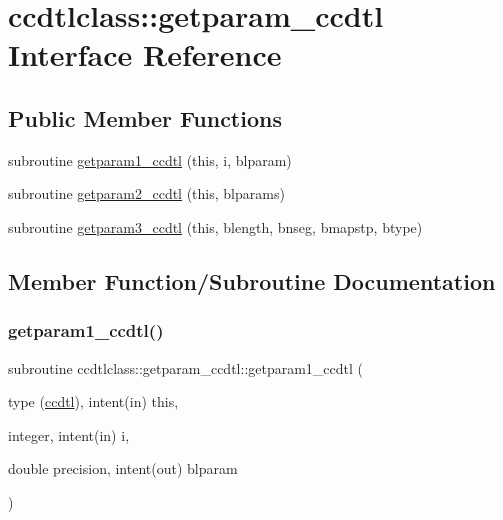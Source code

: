 \hypertarget{interfaceccdtlclass_1_1getparam__ccdtl}{}\section{ccdtlclass\+::getparam\+\_\+ccdtl Interface Reference}
\label{interfaceccdtlclass_1_1getparam__ccdtl}
\subsection*{Public Member Functions}
\begin{DoxyCompactItemize}
\item 
subroutine \mbox{\hyperlink{interfaceccdtlclass_1_1getparam__ccdtl_aaaf3cd47d60dd98385c6a0b9b54beacf}{getparam1\+\_\+ccdtl}} (this, i, blparam)
\item 
subroutine \mbox{\hyperlink{interfaceccdtlclass_1_1getparam__ccdtl_a3902162821423941373ef12a3ad5de5f}{getparam2\+\_\+ccdtl}} (this, blparams)
\item 
subroutine \mbox{\hyperlink{interfaceccdtlclass_1_1getparam__ccdtl_a9d1046f5acff002e8457add43770fa9c}{getparam3\+\_\+ccdtl}} (this, blength, bnseg, bmapstp, btype)
\end{DoxyCompactItemize}


\subsection{Member Function/\+Subroutine Documentation}
\mbox{\label{interfaceccdtlclass_1_1getparam__ccdtl_aaaf3cd47d60dd98385c6a0b9b54beacf}} 
\subsubsection{\texorpdfstring{getparam1\_ccdtl()}{getparam1\_ccdtl()}}
{\footnotesize\ttfamily subroutine ccdtlclass\+::getparam\+\_\+ccdtl\+::getparam1\+\_\+ccdtl (\begin{DoxyParamCaption}\item[{type (\mbox{\hyperlink{namespaceccdtlclass_structccdtlclass_1_1ccdtl}{ccdtl}}), intent(in)}]{this,  }\item[{integer, intent(in)}]{i,  }\item[{double precision, intent(out)}]{blparam }\end{DoxyParamCaption})}

